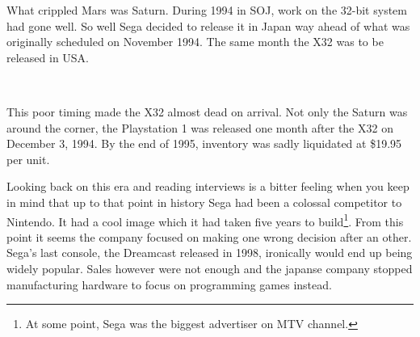What crippled Mars was Saturn. During 1994 in SOJ, work on the 32-bit system had gone well. So well Sega decided to release it in Japan way ahead of what was originally scheduled on November 1994. The same month the X32 was to be released in USA.\\

\par

\\
 \par This poor timing made the X32 almost dead on arrival. Not only the Saturn was around the corner, the  Playstation 1 was released one month after the X32 on December 3, 1994. By the end of 1995, inventory was sadly liquidated at \$19.95 per unit.\\
\par
Looking back on this era and reading interviews is a bitter feeling when you keep in mind that up to that point in history Sega had been a colossal competitor to Nintendo. It had a cool image which it had taken five years to build\footnote{At some point, Sega was the biggest advertiser on MTV channel.}. From this point it seems the company focused on making one wrong decision after an other. Sega's last console, the Dreamcast released in 1998, ironically would end up being widely popular. Sales however were not enough and the japanse company stopped manufacturing hardware to focus on programming games instead.\\ 





